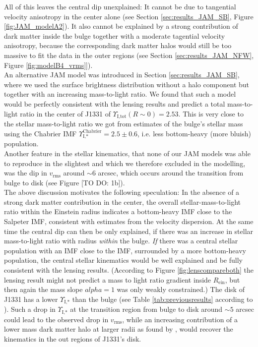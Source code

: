 All of this leaves the central dip unexplained: It cannot be due to tangential velocity anisotropy in the center alone (see Section \ref{sec:results_JAM_SB}, Figure \ref{fig:JAM_modelA2}). It also cannot be explained by a strong contribution of dark matter inside the bulge together with a moderate tagential velocity anisotropy, because the corresponding dark matter halos would still be too massive to fit the data in the outer regions (see Section \ref{sec:results_JAM_NFW}, Figure \ref{fig:modelB4_vrms}]).\\

An alternative JAM model was introduced in Section \ref{sec:results_JAM_SB}, where we used the surface brightness distribution without a halo component but together with an increasing mass-to-light ratio. We found that such a model would be perfectly consistent with the lensing results and predict a total mass-to-light ratio in the center of J1331 of  $\Upsilon_\text{I,tot}(R\sim0) = 2.53$. This is very close to the stellar mass-to-light ratio we got from \citet{SWELLSI} estimates of the bulge's stellar mass using the Chabrier IMF $\Upsilon_\text{I,*}^\text{Chabrier} = 2.5 \pm 0.6$, i.e. less bottom-heavy (more bluish) population.\\

Another feature in the stellar kinematics, that none of our JAM models was able to reproduce in the slightest and which we therefore excluded in the modelling, was the dip in $v_\text{rms}$ around $\sim 6$ arcsec, which occurs around the transition from bulge to disk (see Figure [TO DO: 1b]).\\

The above discussion motivates the following speculation: In the absence of a strong dark matter contribution in the center, the overall stellar-mass-to-light ratio within the Einstein radius indicates a bottom-heavy IMF close to the Salpeter IMF, consistent with estimates from the velocity dispersion. At the same time the central dip can then be only explained, if there was an increase in stellar mass-to-light ratio with radius \textit{within} the bulge. \emph{If} there was a central stellar population with an IMF close to the \citet{Chabrier2003} IMF, surrounded by a more bottom-heavy population, the central stellar kinematics would be well explained and be fully consistent with the lensing results. (According to Figure \ref{fig:lenscompareboth} the lensing result might not predict a mass to light ratio gradient inside $R_\text{ein}$, but then again the mass slope $alpha=1$ was only weakly constrained.) The disk of J1331 has a lower $\Upsilon_\text{I,*}$ than the bulge (see Table \ref{tab:previousresults} according to \citet{SWELLSI}). Such a drop in $\Upsilon_\text{I,*}$ at the transition region from bulge to disk around $\sim 5$ arcsec could lead to the observed drop in $v_\text{rms}$, while an increasing contribution of a lower mass dark matter halo at larger radii as found by \citet{SWELLSV}, would recover the kinematics in the out regions of J1331's disk.\\



